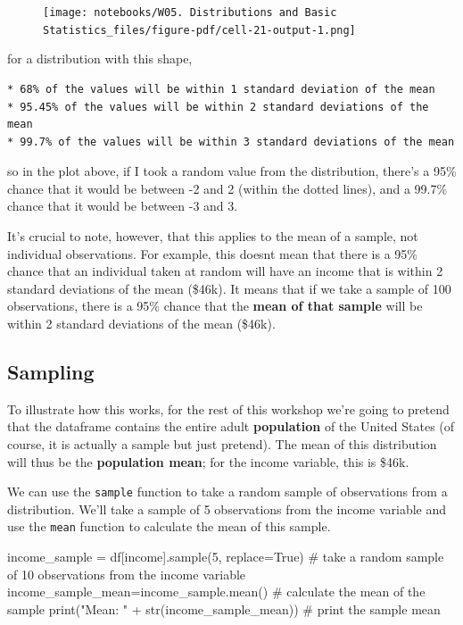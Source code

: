 \documentclass[
  letterpaper,
  DIV=11,
  numbers=noendperiod]{scrreprt}
\newenvironment{Shaded}{\begin{snugshade}}{\end{snugshade}}
\newcommand{\BuiltInTok}[1]{\textcolor[rgb]{0.00,0.23,0.31}{#1}}
\newcommand{\CommentTok}[1]{\textcolor[rgb]{0.37,0.37,0.37}{#1}}
\newcommand{\DecValTok}[1]{\textcolor[rgb]{0.68,0.00,0.00}{#1}}
\newcommand{\NormalTok}[1]{\textcolor[rgb]{0.00,0.23,0.31}{#1}}
\newcommand{\OperatorTok}[1]{\textcolor[rgb]{0.37,0.37,0.37}{#1}}
\newcommand{\StringTok}[1]{\textcolor[rgb]{0.13,0.47,0.30}{#1}}
\newcommand{\VariableTok}[1]{\textcolor[rgb]{0.07,0.07,0.07}{#1}}
\begin{document}
\begin{figure}[H]

{\centering \texttt{[image: notebooks/W05. Distributions and Basic Statistics\_files/figure-pdf/cell-21-output-1.png]}

}

\end{figure}

for a distribution with this shape,

\begin{verbatim}
* 68% of the values will be within 1 standard deviation of the mean
* 95.45% of the values will be within 2 standard deviations of the mean
* 99.7% of the values will be within 3 standard deviations of the mean
\end{verbatim}

so in the plot above, if I took a random value from the distribution,
there's a 95\% chance that it would be between -2 and 2 (within the
dotted lines), and a 99.7\% chance that it would be between -3 and 3.

It's crucial to note, however, that this applies to the mean of a
sample, not individual observations. For example, this doesnt mean that
there is a 95\% chance that an individual taken at random will have an
income that is within 2 standard deviations of the mean (\$46k). It
means that if we take a sample of 100 observations, there is a 95\%
chance that the \textbf{mean of that sample} will be within 2 standard
deviations of the mean (\$46k).

\hypertarget{sampling}{%
\subsection{Sampling}\label{sampling}}

To illustrate how this works, for the rest of this workshop we're going
to pretend that the dataframe contains the entire adult
\textbf{population} of the United States (of course, it is actually a
sample but just pretend). The mean of this distribution will thus be the
\textbf{population mean}; for the income variable, this is \$46k.

We can use the \texttt{sample} function to take a random sample of
observations from a distribution. We'll take a sample of 5 observations
from the income variable and use the \texttt{mean} function to calculate
the mean of this sample.

\begin{Shaded}
\begin{Highlighting}[]
\NormalTok{income\_sample }\OperatorTok{=}\NormalTok{ df[}\StringTok{\textquotesingle{}income\textquotesingle{}}\NormalTok{].sample(}\DecValTok{5}\NormalTok{, replace}\OperatorTok{=}\VariableTok{True}\NormalTok{) }\CommentTok{\# take a random sample of 10 observations from the income variable}
\NormalTok{income\_sample\_mean}\OperatorTok{=}\NormalTok{income\_sample.mean() }\CommentTok{\# calculate the mean of the sample}
\BuiltInTok{print}\NormalTok{(}\StringTok{"Mean: "} \OperatorTok{+} \BuiltInTok{str}\NormalTok{(income\_sample\_mean)) }\CommentTok{\# print the sample mean}
\end{Highlighting}
\end{Shaded}
\end{document}
